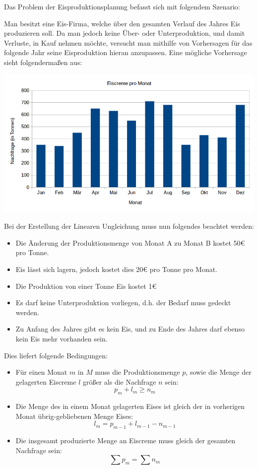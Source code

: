 Das Problem der Eisproduktionsplanung befasst sich mit folgendem Szenario:

Man besitzt eine Eis-Firma, welche über den gesamten Verlauf des Jahres Eis produzieren soll. Da man jedoch keine Über- oder Unterproduktion, und damit Verluste, in Kauf nehmen möchte, versucht man mithilfe von Vorhersagen für das folgende Jahr seine Eisproduktion hieran anzupassen. Eine mögliche Vorhersage sieht folgendermaßen aus:

\centering
\includegraphics[width=\textwidth]{Grafiken/Eiscreme.png}

\raggedright
Bei der Erstellung der Linearen Ungleichung muss nun folgendes beachtet werden:

\begin{itemize}
\item Die Änderung der Produktionsmenge von Monat A zu Monat B kostet 50€ pro Tonne.
\item Eis lässt sich lagern, jedoch kostet dies 20€ pro Tonne pro Monat.
\item Die Produktion von einer Tonne Eis kostet 1€
\item Es darf keine Unterproduktion vorliegen, d.h. der Bedarf muss gedeckt werden.
\item Zu Anfang des Jahres gibt es kein Eis, und zu Ende des Jahres darf ebenso kein Eis mehr vorhanden sein.
\end{itemize}

Dies liefert folgende Bedingungen:
\begin{itemize}
\item Für einen Monat $m$ in $M$ muss die Produktionsmenge $p$, sowie die Menge der gelagerten Eiscreme $l$ größer als die Nachfrage $n$ sein:
\[ p_m + l_m \geq n_m \]
\item Die Menge des in einem Monat gelagerten Eises ist gleich der in vorherigen Monat übrig-gebliebenen Menge Eises:
\[ l_m = p_{m-1} + l_{m-1} - n_{m-1} \]
\item Die insgesamt produzierte Menge an Eiscreme muss gleich der gesamten Nachfrage sein:
\[ \sum p_m = \sum n_m \]
\end{itemize}

